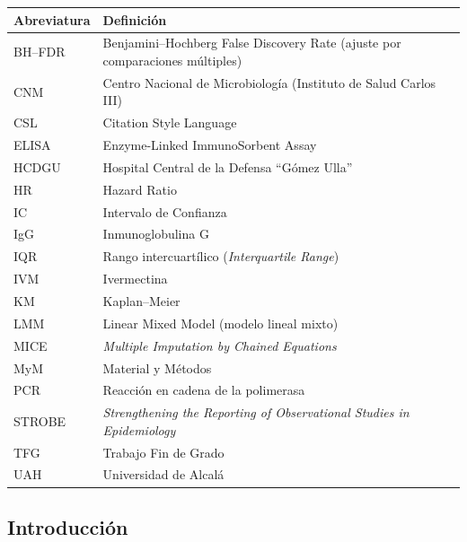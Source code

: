 \documentclass[
  spanish,
  12pt,
  a4paper,
]{article}
\begin{document}
\begin{longtable}[]{@{}
  >{\raggedright\arraybackslash}p{}
  >{\raggedright\arraybackslash}p{}@{}}
\toprule\noalign{}
\begin{minipage}[b]{\linewidth}\raggedright
Abreviatura
\end{minipage} & \begin{minipage}[b]{\linewidth}\raggedright
Definición
\end{minipage} \\
\midrule\noalign{}
\endhead
\bottomrule\noalign{}
\endlastfoot
BH--FDR & Benjamini--Hochberg False Discovery Rate (ajuste por
comparaciones múltiples) \\
CNM & Centro Nacional de Microbiología (Instituto de Salud Carlos
III) \\
CSL & Citation Style Language \\
ELISA & Enzyme-Linked ImmunoSorbent Assay \\
HCDGU & Hospital Central de la Defensa ``Gómez Ulla'' \\
HR & Hazard Ratio \\
IC & Intervalo de Confianza \\
IgG & Inmunoglobulina G \\
IQR & Rango intercuartílico (\emph{Interquartile Range}) \\
IVM & Ivermectina \\
KM & Kaplan--Meier \\
LMM & Linear Mixed Model (modelo lineal mixto) \\
MICE & \emph{Multiple Imputation by Chained Equations} \\
MyM & Material y Métodos \\
PCR & Reacción en cadena de la polimerasa \\
STROBE & \emph{Strengthening the Reporting of Observational Studies in
Epidemiology} \\
TFG & Trabajo Fin de Grado \\
UAH & Universidad de Alcalá \\
\end{longtable}

\newpage

\subsection*{Introducción}\label{introducciuxf3n}
\end{document}
